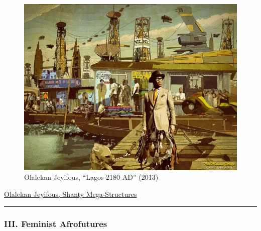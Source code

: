 \documentclass[
  letterpaper,
  DIV=11,
  numbers=noendperiod]{scrartcl}
\begin{document}
\begin{figure}

{\centering \includegraphics{../img/lagos-2180.jpg}

}

\caption{Olalekan Jeyifous, ``Lagos 2180 AD'' (2013)}

\end{figure}

\href{https://jeyifo.us/SMS}{Olalekan Jeyifous, Shanty Mega-Structures}

\begin{center}\rule{0.5\linewidth}{0.5pt}\end{center}

\hypertarget{iii.-feminist-afrofutures}{%
\subsubsection{III. Feminist
Afrofutures}\label{iii.-feminist-afrofutures}}
\end{document}
